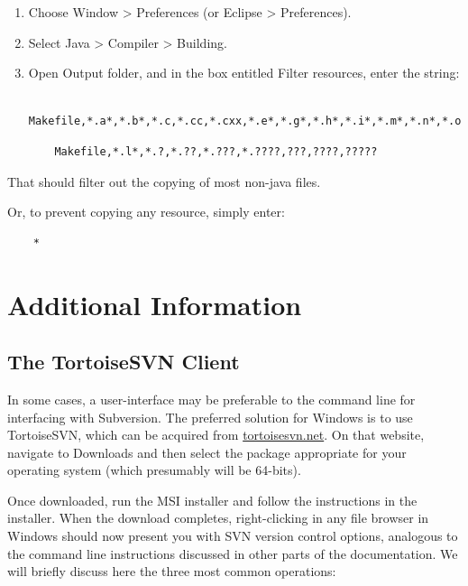 \begin{enumerate}

\item Choose {\sf Window > Preferences} (or {\sf Eclipse > Preferences}).

\item Select {\sf Java > Compiler > Building}.

\item Open {\sf Output folder}, and in the box entitled {\sf Filter resources},
  enter the string:

\ifWindows
\begin{lstlisting}
    Makefile,*.a*,*.b*,*.c,*.cc,*.cxx,*.e*,*.g*,*.h*,*.i*,*.m*,*.n*,*.o*,*.r*,*.s*,*.t*
\end{lstlisting}
\else
\begin{lstlisting}
    Makefile,*.l*,*.?,*.??,*.???,*.????,???,????,?????
\end{lstlisting}
\fi

\end{enumerate}

That should filter out the copying of most non-java files.

Or, to prevent copying any resource, simply enter: 
\begin{lstlisting}
    *
\end{lstlisting}

\section{Additional Information}

\ifWindows
\subsection{The TortoiseSVN Client}
\label{TortoiseSVN}

In some cases, a user-interface may be preferable to the command line
for interfacing with Subversion. The preferred solution for Windows is
to use TortoiseSVN, which can be acquired from
\href{http://tortoisesvn.net}{tortoisesvn.net}. On that website,
navigate to {\sf Downloads} and then select the package appropriate
for your operating system (which presumably will be 64-bits).

Once downloaded, run the MSI installer and follow the instructions in
the installer. When the download completes, right-clicking in any file
browser in Windows should now present you with SVN version control
options, analogous to the command line instructions discussed in other
parts of the documentation. We will briefly discuss here the three
most common operations:

